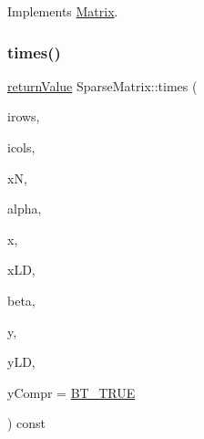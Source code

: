 Implements \hyperlink{class_matrix_a329b638ce6ce41715b156766646b3fcc}{Matrix}.

\mbox{\label{class_sparse_matrix_a6f8c19375fc324ed574a5ff051b451e8}} 
\subsubsection{\texorpdfstring{times()}{times()}\hspace{0.1cm}{\footnotesize\ttfamily [2/2]}}
{\footnotesize\ttfamily \hyperlink{_message_handling_8hpp_a81d556f613bfbabd0b1f9488c0fa865e}{return\+Value} Sparse\+Matrix\+::times (\begin{DoxyParamCaption}\item[{const \hyperlink{class_indexlist}{Indexlist} $\ast$const}]{irows,  }\item[{const \hyperlink{class_indexlist}{Indexlist} $\ast$const}]{icols,  }\item[{\hyperlink{_types_8hpp_ab6fd6105e64ed14a0c9281326f05e623}{int\+\_\+t}}]{xN,  }\item[{\hyperlink{qp_o_a_s_e_s__wrapper_8h_a0d00e2b3dfadee81331bbb39068570c4}{real\+\_\+t}}]{alpha,  }\item[{const \hyperlink{qp_o_a_s_e_s__wrapper_8h_a0d00e2b3dfadee81331bbb39068570c4}{real\+\_\+t} $\ast$}]{x,  }\item[{\hyperlink{_types_8hpp_ab6fd6105e64ed14a0c9281326f05e623}{int\+\_\+t}}]{x\+LD,  }\item[{\hyperlink{qp_o_a_s_e_s__wrapper_8h_a0d00e2b3dfadee81331bbb39068570c4}{real\+\_\+t}}]{beta,  }\item[{\hyperlink{qp_o_a_s_e_s__wrapper_8h_a0d00e2b3dfadee81331bbb39068570c4}{real\+\_\+t} $\ast$}]{y,  }\item[{\hyperlink{_types_8hpp_ab6fd6105e64ed14a0c9281326f05e623}{int\+\_\+t}}]{y\+LD,  }\item[{\hyperlink{_types_8hpp_a20f82124c82b6f5686a7fce454ef9089}{Boolean\+Type}}]{y\+Compr = {\ttfamily \hyperlink{_types_8hpp_a20f82124c82b6f5686a7fce454ef9089a34c57965bfb07125b09326a69019f9c6}{B\+T\+\_\+\+T\+R\+UE}} }\end{DoxyParamCaption}) const\hspace{0.3cm}{\ttfamily [virtual]}}

